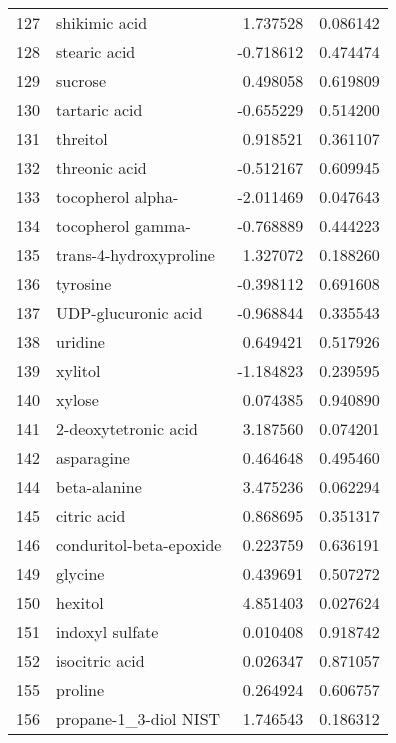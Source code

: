 \begin{tabular}{llrr}
127 &                      shikimic acid &  1.737528 &  0.086142 \\
128 &                       stearic acid & -0.718612 &  0.474474 \\
129 &                            sucrose &  0.498058 &  0.619809 \\
130 &                      tartaric acid & -0.655229 &  0.514200 \\
131 &                           threitol &  0.918521 &  0.361107 \\
132 &                      threonic acid & -0.512167 &  0.609945 \\
133 &                  tocopherol alpha- & -2.011469 &  0.047643 \\
134 &                  tocopherol gamma- & -0.768889 &  0.444223 \\
135 &             trans-4-hydroxyproline &  1.327072 &  0.188260 \\
136 &                           tyrosine & -0.398112 &  0.691608 \\
137 &                UDP-glucuronic acid & -0.968844 &  0.335543 \\
138 &                            uridine &  0.649421 &  0.517926 \\
139 &                            xylitol & -1.184823 &  0.239595 \\
140 &                             xylose &  0.074385 &  0.940890 \\
141 &               2-deoxytetronic acid &  3.187560 &  0.074201 \\
142 &                         asparagine &  0.464648 &  0.495460 \\
144 &                       beta-alanine &  3.475236 &  0.062294 \\
145 &                        citric acid &  0.868695 &  0.351317 \\
146 &            conduritol-beta-epoxide &  0.223759 &  0.636191 \\
149 &                            glycine &  0.439691 &  0.507272 \\
150 &                            hexitol &  4.851403 &  0.027624 \\
151 &                    indoxyl sulfate &  0.010408 &  0.918742 \\
152 &                     isocitric acid &  0.026347 &  0.871057 \\
155 &                            proline &  0.264924 &  0.606757 \\
156 &              propane-1\_3-diol NIST &  1.746543 &  0.186312 \\
\bottomrule
\end{tabular}
